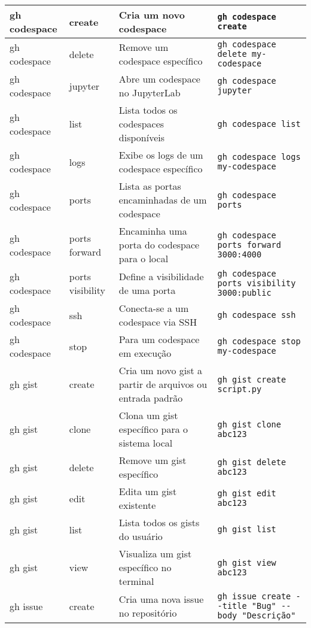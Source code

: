 \begin{longtable}{|p{2cm}|p{2.3cm}|p{4cm}|p{6cm}|}
    \hline
    gh codespace & create & Cria um novo codespace & \texttt{gh codespace create} \\
    \hline
    gh codespace & delete & Remove um codespace específico & \texttt{gh codespace delete my-codespace} \\
    \hline
    gh codespace & jupyter & Abre um codespace no JupyterLab & \texttt{gh codespace jupyter} \\
    \hline
    gh codespace & list & Lista todos os codespaces disponíveis & \texttt{gh codespace list} \\
    \hline
    gh codespace & logs & Exibe os logs de um codespace específico & \texttt{gh codespace logs my-codespace} \\
    \hline
    gh codespace & ports & Lista as portas encaminhadas de um codespace & \texttt{gh codespace ports} \\
    \hline
    gh codespace & ports forward & Encaminha uma porta do codespace para o local & \texttt{gh codespace ports forward 3000:4000} \\
    \hline
    gh codespace & ports visibility & Define a visibilidade de uma porta & \texttt{gh codespace ports visibility 3000:public} \\
    \hline
    gh codespace & ssh & Conecta-se a um codespace via SSH & \texttt{gh codespace ssh} \\
    \hline
    gh codespace & stop & Para um codespace em execução & \texttt{gh codespace stop my-codespace} \\
    \hline
    gh gist & create & Cria um novo gist a partir de arquivos ou entrada padrão & \texttt{gh gist create script.py} \\
    \hline
    gh gist & clone & Clona um gist específico para o sistema local & \texttt{gh gist clone abc123} \\
    \hline
    gh gist & delete & Remove um gist específico & \texttt{gh gist delete abc123} \\
    \hline
    gh gist & edit & Edita um gist existente & \texttt{gh gist edit abc123} \\
    \hline
    gh gist & list & Lista todos os gists do usuário & \texttt{gh gist list} \\
    \hline
    gh gist & view & Visualiza um gist específico no terminal & \texttt{gh gist view abc123} \\
    \hline
    gh issue & create & Cria uma nova issue no repositório & \texttt{gh issue create -{-}title "Bug" -{-}body "Descrição"} \\

\end{longtable}
